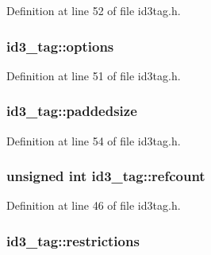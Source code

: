 Definition at line 52 of file id3tag.\+h.

\subsubsection[{\texorpdfstring{options}{options}}]{ id3\+\_\+tag\+::options}\hypertarget{structid3__tag_a4d383bbf55e70cbd7549e7ebefafecbc}{}\label{structid3__tag_a4d383bbf55e70cbd7549e7ebefafecbc}


Definition at line 51 of file id3tag.\+h.

\subsubsection[{\texorpdfstring{paddedsize}{paddedsize}}]{ id3\+\_\+tag\+::paddedsize}\hypertarget{structid3__tag_ae13479043b2d821d070d55a381b07013}{}\label{structid3__tag_ae13479043b2d821d070d55a381b07013}


Definition at line 54 of file id3tag.\+h.

\subsubsection[{\texorpdfstring{refcount}{refcount}}]{\setlength{\rightskip}{0pt plus 5cm}unsigned {\bf int} id3\+\_\+tag\+::refcount}\hypertarget{structid3__tag_aa2a5d470661f86bd8760bb84267d8216}{}\label{structid3__tag_aa2a5d470661f86bd8760bb84267d8216}


Definition at line 46 of file id3tag.\+h.

\subsubsection[{\texorpdfstring{restrictions}{restrictions}}]{ id3\+\_\+tag\+::restrictions}\hypertarget{structid3__tag_aecfeed1b65c8b5151084c15d0d8348f9}{}\label{structid3__tag_aecfeed1b65c8b5151084c15d0d8348f9}


